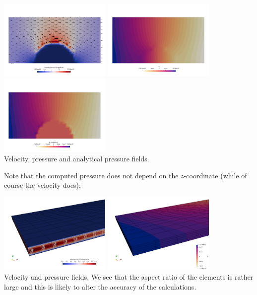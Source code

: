 \begin{center}
\includegraphics[width=5.4cm]{python_codes/fieldstone_109/results/vel}
\includegraphics[width=5.4cm]{python_codes/fieldstone_109/results/press}
\includegraphics[width=5.4cm]{python_codes/fieldstone_109/results/press_anal}\\
{\captionfont Velocity, pressure and analytical pressure fields. }
\end{center}

Note that the computed pressure does not depend on the $z$-coordinate (while of course the velocity does): 
\begin{center}
\includegraphics[width=5.4cm]{python_codes/fieldstone_109/results/vel2}
\includegraphics[width=5.4cm]{python_codes/fieldstone_109/results/press2}\\
{\captionfont Velocity and pressure fields. We see that the aspect ratio of the elements
is rather large and this is likely to alter the accuracy of the calculations.}
\end{center}

